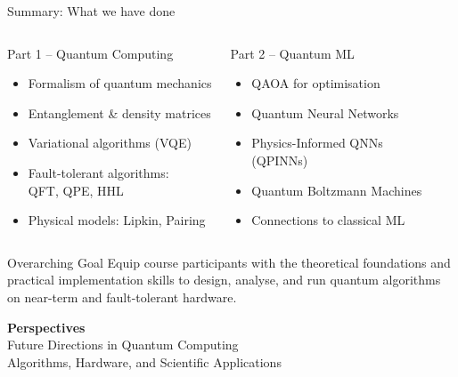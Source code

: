 \documentclass[aspectratio=169,10pt]{beamer}
\begin{document}
\begin{frame}{Summary: What we have done}
  \begin{columns}[T]
      \begin{block}{Part 1 -- Quantum Computing}
        \begin{itemize}
          \item Formalism of quantum mechanics
          \item Entanglement \& density matrices
          \item Variational algorithms (VQE)
          \item Fault-tolerant algorithms:\\
                QFT, QPE, HHL
          \item Physical models: Lipkin, Pairing
        \end{itemize}
      \end{block}
      \begin{block}{Part 2 -- Quantum ML}
        \begin{itemize}
          \item QAOA for optimisation
          \item Quantum Neural Networks
          \item Physics-Informed QNNs\\
                (QPINNs)
          \item Quantum Boltzmann Machines
          \item Connections to classical ML
        \end{itemize}
      \end{block}
  \end{columns}
  \vspace{8pt}
  \begin{alertblock}{Overarching Goal}
    Equip course participants with the theoretical foundations
    and practical implementation skills to design, analyse, and run
    quantum algorithms on near-term and fault-tolerant hardware.
  \end{alertblock}
\end{frame}


\begin{frame}[plain]
  \begin{center}
    \vspace{1.4cm}
    {\Huge\bfseries\color{qblue} Perspectives}\\[0.5em]
    {\Large\color{black} Future Directions in Quantum Computing}\\[0.3em]
    {\normalsize\color{gray} Algorithms, Hardware, and Scientific Applications}
  \end{center}
\end{frame}
\end{document}
